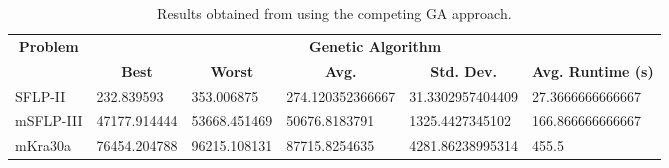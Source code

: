 \begin{table}[h!]
\begin{adjustwidth}{-1.15in}{}
\centering
\begin{tabular}{|l|l|l|l|l|l|}
	\hline
	\multicolumn{1}{|c|}{\multirow{2}{*}{\textbf{Problem}}} & \multicolumn{5}{c|}{\textbf{Genetic Algorithm}}                                                                                                                                                                                            \\ \cline{2-6} 
	\multicolumn{1}{|c|}{}                                  & \multicolumn{1}{c|}{\textbf{Best}} & \multicolumn{1}{c|}{\textbf{Worst}} & \multicolumn{1}{c|}{\textbf{Avg.}} & \multicolumn{1}{c|}{\textbf{Std. Dev.}} & \multicolumn{1}{c|}{\textbf{Avg. Runtime (s)}} \\ \hline
	SFLP-II                                                 & 232.839593                                  & 353.006875                                   & 274.120352366667                      &
	31.3302957404409						& 27.3666666666667                                   \\ \hline
	mSFLP-III                                               & 47177.914444                               & 53668.451469                                 & 50676.8183791                      & 1325.4427345102                                  & 166.866666666667                           \\ \hline
	mKra30a                                               & 76454.204788                                & 96215.108131                                 &
	87715.8254635							&
	4281.86238995314	                        &
	455.5								\\ \hline
\end{tabular}
\end{adjustwidth}
\caption{Results obtained from using the competing GA approach.}
\label{approach-ga-results}
\end{table}

